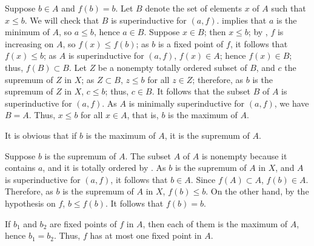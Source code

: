 \documentclass{article}
\begin{document}
\begin{solution}[\ref{exe:ycuba4tr}]
  \label{sol:yyedjd3p}
  Suppose \(b \in A\) and \(f(b) = b\).  Let \(B\) denote the set of
  elements \(x\) of \(A\) such that \(x \leq b\).  We will check that
  \(B\) is superinductive for \((a, f)\).   implies
  that \(a\) is the minimum of \(A\), so \(a \leq b\), hence
  \(a \in B\).  Suppose \(x \in B\); then \(x \leq b\); by
  , \(f\) is increasing on \(A\), so
  \(f(x) \leq f(b)\); as \(b\) is a fixed point of \(f\), it follows
  that \(f(x) \leq b\); as \(A\) is superinductive for \((a, f)\),
  \(f(x) \in A\); hence \(f(x) \in B\); thus, \(f(B) \subset B\).  Let
  \(Z\) be a nonempty totally ordered subset of \(B\), and \(c\) the
  supremum of \(Z\) in \(X\); as \(Z \subset B\), \(z \leq b\) for all
  \(z \in Z\); therefore, as \(b\) is the supremum of \(Z\) in \(X\),
  \(c \leq b\); thus, \(c \in B\).  It follows that the subset \(B\)
  of \(A\) is superinductive for \((a, f)\).  As \(A\) is minimally
  superinductive for \((a,f)\), we have \(B = A\).  Thus, \(x \leq b\)
  for all \(x \in A\), that is, \(b\) is the maximum of \(A\).

  It is obvious that if \(b\) is the maximum of \(A\), it is the
  supremum of \(A\).

  Suppose \(b\) is the supremum of \(A\).  The subset \(A\) of \(A\)
  is nonempty because it contains \(a\), and it is totally ordered by
  .  As \(b\) is the supremum of \(A\) in \(X\),
  and \(A\) is superinductive for \((a, f)\), it follows that
  \(b \in A\).  Since \(f(A) \subset A\), \(f(b) \in A\).  Therefore,
  as \(b\) is the supremum of \(A\) in \(X\), \(f(b) \leq b\).  On the
  other hand, by the hypothesis on \(f\), \(b \leq f(b)\).  It follows
  that \(f(b) = b\).

  If \(b_1\) and \(b_2\) are fixed points of \(f\) in \(A\), then each
  of them is the maximum of \(A\), hence \(b_1 = b_2\).  Thus, \(f\)
  has at most one fixed point in \(A\).
\end{solution}
\end{document}
